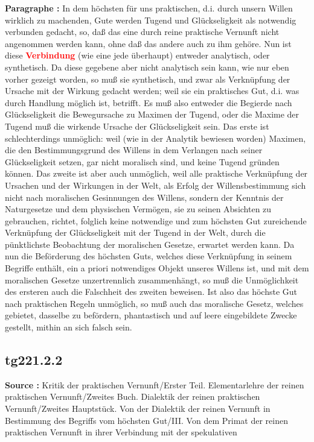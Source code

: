 \documentclass[a4paper,12pt,twoside]{book}
\newcommand{\match}[1]{\textcolor{red}{\textbf{#1}}}
\begin{document}
	\noindent\textbf{Paragraphe : }In dem höchsten für uns praktischen, d.i. durch unsern Willen wirklich zu machenden, Gute werden Tugend und Glückseligkeit als notwendig verbunden gedacht, so, daß das eine durch reine praktische Vernunft nicht angenommen werden kann, ohne daß das andere auch zu ihm gehöre. Nun ist diese \match{Verbindung} (wie eine jede überhaupt) entweder analytisch, oder synthetisch. Da diese gegebene aber nicht analytisch sein kann, wie nur eben vorher gezeigt worden, so muß sie synthetisch, und zwar als Verknüpfung der Ursache mit der Wirkung gedacht werden; weil sie ein praktisches Gut, d.i. was durch Handlung möglich ist, betrifft. Es muß also entweder die Begierde nach Glückseligkeit die Bewegursache zu Maximen der Tugend, oder die Maxime der Tugend muß die wirkende Ursache der Glückseligkeit sein. Das erste ist schlechterdings unmöglich: weil (wie in der Analytik bewiesen worden) Maximen, die den Bestimmungsgrund des Willens in dem Verlangen nach seiner Glückseligkeit setzen, gar nicht moralisch sind, und keine Tugend gründen können. Das zweite ist aber auch unmöglich, weil alle praktische Verknüpfung der Ursachen und der Wirkungen in der Welt, als Erfolg der Willensbestimmung sich nicht nach moralischen Gesinnungen des Willens, sondern der Kenntnis der Naturgesetze und dem physischen Vermögen, sie zu seinen Absichten zu gebrauchen, richtet, folglich keine notwendige und zum höchsten Gut zureichende Verknüpfung der Glückseligkeit mit der Tugend in der Welt, durch die pünktlichste Beobachtung der moralischen Gesetze, erwartet werden kann. Da nun die Beförderung des höchsten Guts, welches diese Verknüpfung in seinem Begriffe enthält, ein a priori notwendiges Objekt unseres Willens ist, und mit dem moralischen Gesetze unzertrennlich zusammenhängt, so muß die Unmöglichkeit des ersteren auch die Falschheit des zweiten beweisen. Ist also das höchste Gut nach praktischen Regeln unmöglich, so muß auch das moralische Gesetz, welches gebietet, dasselbe  zu befördern, phantastisch und auf leere eingebildete Zwecke gestellt, mithin an sich falsch sein. 
	
	\subsection*{tg221.2.2} 
	\textbf{Source : }Kritik der praktischen Vernunft/Erster Teil. Elementarlehre der reinen praktischen Vernunft/Zweites Buch. Dialektik der reinen praktischen Vernunft/Zweites Hauptstück. Von der Dialektik der reinen Vernunft in Bestimmung des Begriffs vom höchsten Gut/III. Von dem Primat der reinen praktischen Vernunft in ihrer Verbindung mit der spekulativen\\  
	
\end{document}
